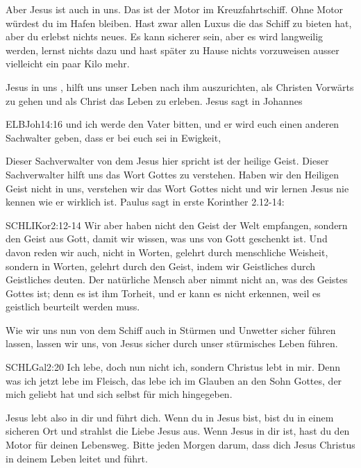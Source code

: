 \begin{spacing}{1.5}
Aber Jesus ist auch in uns. Das ist der Motor im Kreuzfahrtschiff. Ohne Motor würdest du im Hafen bleiben. Hast zwar allen Luxus die das Schiff zu bieten hat, aber du erlebst nichts neues. Es kann sicherer sein, aber es wird langweilig werden, lernst nichts dazu und hast später zu Hause nichts vorzuweisen ausser vielleicht ein paar Kilo mehr.

\flqq Jesus in uns \frqq{}, hilft uns unser Leben nach ihm auszurichten, als Christen Vorwärts zu gehen und als Christ das Leben zu erleben. Jesus sagt in Johannes 
\begin{bibelbox}{ELB}{Joh}{14:16}
und ich werde den Vater bitten, und er wird euch einen anderen Sachwalter geben, dass er bei euch sei in Ewigkeit,
\end{bibelbox}
Dieser Sachverwalter von dem Jesus hier spricht ist der heilige Geist. Dieser Sachverwalter hilft uns das Wort Gottes zu verstehen. Haben wir den Heiligen Geist nicht in uns, verstehen wir das Wort Gottes nicht und wir lernen Jesus nie kennen wie er wirklich ist. Paulus sagt in erste Korinther 2.12-14:
\begin{bibelbox}{SCHL}{IKor}{2:12-14}
Wir aber haben nicht den Geist der Welt empfangen, sondern den Geist aus Gott, damit wir wissen, was uns von Gott geschenkt ist. Und davon reden wir auch, nicht in Worten, gelehrt durch menschliche Weisheit, sondern in Worten, gelehrt durch den Geist, indem wir Geistliches durch Geistliches deuten. Der natürliche Mensch aber nimmt nicht an, was des Geistes Gottes ist; denn es ist ihm Torheit, und er kann es nicht erkennen, weil es geistlich beurteilt werden muss.
\end{bibelbox}
Wie wir uns nun von dem Schiff auch in Stürmen und Unwetter sicher führen lassen, lassen wir uns, von Jesus sicher durch unser stürmisches Leben führen.
\begin{bibelbox}{SCHL}{Gal}{2:20}
Ich lebe, doch nun nicht ich, sondern Christus lebt in mir. Denn was ich jetzt lebe im Fleisch, das lebe ich im Glauben an den Sohn Gottes, der mich geliebt hat und sich selbst für mich hingegeben.
\end{bibelbox}
Jesus lebt also in dir und führt dich. Wenn du in Jesus bist, bist du in einem sicheren Ort und strahlst die Liebe Jesus aus. Wenn Jesus in dir ist, hast du den Motor für deinen Lebensweg. Bitte jeden Morgen darum, dass dich Jesus Christus in deinem Leben leitet und führt.

\end{spacing}



